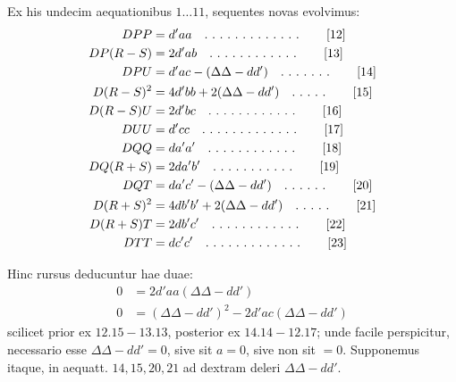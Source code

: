 Ex his undecim aequationibus $1\ldots11$, sequentes novas evolvimus:
\begin{align*}
DPP&=d'aa\quad\ldotp\,\ldotp\,\ldotp\,\ldotp\,\ldotp\,\ldotp\,\ldotp\,\ldotp\,\ldotp\,\ldotp\,\ldotp\,\ldotp\,\ldotp\tag*{[12]}\\
DP(R-S)&=2d'ab\quad\ldotp\,\ldotp\,\ldotp\,\ldotp\,\ldotp\,\ldotp\,\ldotp\,\ldotp\,\ldotp\,\ldotp\,\ldotp\,\ldotp\tag*{[13]}\\
DPU&=d'ac-(\Delta\Delta-dd')\quad\ldotp\,\ldotp\,\ldotp\,\ldotp\,\ldotp\,\ldotp\,\ldotp\tag*{[14]}\\
D(R-S)^2&=4d'bb+2(\Delta\Delta-dd')\quad\ldotp\,\ldotp\,\ldotp\,\ldotp\,\ldotp\tag*{[15]}\\
D(R-S)U&=2d'bc\quad\ldotp\,\ldotp\,\ldotp\,\ldotp\,\ldotp\,\ldotp\,\ldotp\,\ldotp\,\ldotp\,\ldotp\,\ldotp\,\ldotp\tag*{[16]}\\
DUU&=d'cc\quad\ldotp\,\ldotp\,\ldotp\,\ldotp\,\ldotp\,\ldotp\,\ldotp\,\ldotp\,\ldotp\,\ldotp\,\ldotp\,\ldotp\,\ldotp\tag*{[17]}\\
DQQ&=da'a'\quad\ldotp\,\ldotp\,\ldotp\,\ldotp\,\ldotp\,\ldotp\,\ldotp\,\ldotp\,\ldotp\,\ldotp\,\ldotp\,\ldotp\tag*{[18]}\\
DQ(R+S)&=2da'b'\quad\ldotp\,\ldotp\,\ldotp\,\ldotp\,\ldotp\,\ldotp\,\ldotp\,\ldotp\,\ldotp\,\ldotp\,\ldotp\tag*{[19]}\\
DQT&=da'c'-(\Delta\Delta-dd')\quad\ldotp\,\ldotp\,\ldotp\,\ldotp\,\ldotp\,\ldotp\tag*{[20]}\\
D(R+S)^2&=4db'b'+2(\Delta\Delta-dd')\quad\ldotp\,\ldotp\,\ldotp\,\ldotp\,\ldotp\tag*{[21]}\\
D(R+S)T&=2db'c'\quad\ldotp\,\ldotp\,\ldotp\,\ldotp\,\ldotp\,\ldotp\,\ldotp\,\ldotp\,\ldotp\,\ldotp\,\ldotp\,\ldotp\tag*{[22]}\\
DTT&=dc'c'\quad\ldotp\,\ldotp\,\ldotp\,\ldotp\,\ldotp\,\ldotp\,\ldotp\,\ldotp\,\ldotp\,\ldotp\,\ldotp\,\ldotp\,\ldotp\tag*{[23]}
\end{align*}

Hinc rursus deducuntur hae duae:
\[
\begin{aligned}
0&=2d'aa(\Delta\Delta-dd')\\
0&=(\Delta\Delta-dd')^2-2d'ac(\Delta\Delta-dd')
\end{aligned}
\]
scilicet prior ex $12.15-13.13$, posterior ex $14.14-12.17$; unde facile perspicitur, necessario esse $\Delta\Delta-dd'=0$, sive sit $a=0$, sive non sit $=0$. Supponemus itaque, in aequatt. $14,15,20,21$ ad dextram deleri $\Delta\Delta-dd'$.

